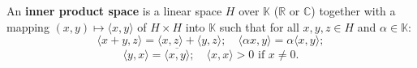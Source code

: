 An \textbf{inner product space} is a linear space $H$ over $\mathbb{K}$ ($\mathbb{R}$ or $\mathbb{C}$) together with a mapping $(x, y) \mapsto \langle x, y \rangle$ of $H \times H$ into $\mathbb{K}$ such that for all $x, y, z \in H$ and $\alpha \in \mathbb{K}$:
$$\langle x + y, z \rangle = \langle x, z \rangle + \langle y, z \rangle; \quad \langle \alpha x, y \rangle = \alpha \langle x, y \rangle;$$
$$\langle y, x \rangle = \overline{\langle x, y \rangle}; \quad \langle x, x \rangle > 0 \text{ if } x \neq 0.$$
